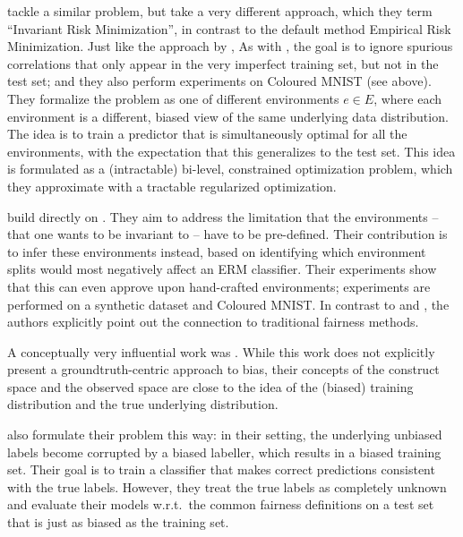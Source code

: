 \citet{arjovsky2019invariant} tackle a similar problem, but take a very different approach,
which they term ``Invariant Risk Minimization'', in contrast to the default method Empirical Risk Minimization.
Just like the approach by \citet{kim2019learning}, 
As with \citet{kim2019learning},
the goal is to ignore spurious correlations that only appear in the very imperfect training set,
but not in the test set;
and they also perform experiments on Coloured MNIST (see above).
They formalize the problem as one of different environments $e\in E$,
where each environment is a different, biased view of the same underlying data distribution.
The idea is to train a predictor that is simultaneously optimal for all the environments,
with the expectation that this generalizes to the test set.
This idea is formulated as a (intractable) bi-level, constrained optimization problem,
which they approximate with a tractable regularized optimization.

\citet{creager2020environment} build directly on \citet{arjovsky2019invariant}.
They aim to address the limitation that the environments -- that one wants to be invariant to -- have to be pre-defined.
Their contribution is to infer these environments instead,
based on identifying which environment splits would most negatively affect an ERM classifier.
Their experiments show that this can even approve upon hand-crafted environments;
experiments are performed on a synthetic dataset and Coloured MNIST.
In contrast to \citet{kim2019learning} and \citet{arjovsky2019invariant},
the authors explicitly point out the connection to traditional fairness methods.

A conceptually very influential work was \citet{friedler2016possibility}.
While this work does not explicitly present a groundtruth-centric approach to bias,
their concepts of the construct space and the observed space are close
to the idea of the (biased) training distribution and the true underlying distribution.

\citet{jiang2020identifying} also formulate their problem this way:
in their setting, the underlying unbiased labels become corrupted by a biased labeller,
which results in a biased training set.
Their goal is to train a classifier that makes correct predictions consistent with the true labels.
However, they treat the true labels as completely unknown
and evaluate their models w.r.t.\ the common fairness definitions on a test set
that is just as biased as the training set.

